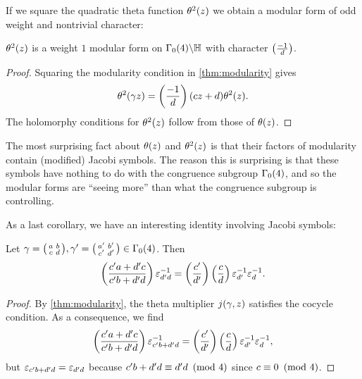 \documentclass[12pt,reqno,oneside]{amsart}
\begin{document}
    If we square the quadratic theta function $\theta^{2}(z)$ we obtain a modular form of odd weight and nontrivial character:

    \begin{corollary}
        $\theta^{2}(z)$ is a weight $1$ modular form on $\Gamma_{0}(4)\backslash\mathbb{H}$ with character $\textstyle{\left(\frac{-1}{d}\right)}$.
    \end{corollary}
    \begin{proof}
        Squaring the modularity condition in \cref{thm:modularity} gives
        \[
            \theta^{2}(\gamma z) = \left(\frac{-1}{d}\right)(cz+d)\theta^{2}(z).
        \]
        The holomorphy conditions for $\theta^{2}(z)$ follow from those of $\theta(z)$.
    \end{proof}
    
    The most surprising fact about $\theta(z)$ and $\theta^{2}(z)$ is that their factors of modularity contain (modified) Jacobi symbols. The reason this is surprising is that these symbols have nothing to do with the congruence subgroup $\Gamma_{0}(4)$, and so the modular forms are ``seeing more'' than what the congruence subgroup is controlling.
    
    As a last corollary, we have an interesting identity involving Jacobi symbols:

    \begin{corollary}
    Let $\gamma = \begin{psmallmatrix} a & b \\ c & d \end{psmallmatrix},\gamma' = \begin{psmallmatrix} a' & b' \\ c' & d' \end{psmallmatrix} \in \Gamma_{0}(4)$. Then
    \[
        \left(\frac{c'a+d'c}{c'b+d'd}\right)\varepsilon_{d'd}^{-1} = \left(\frac{c'}{d'}\right)\left(\frac{c}{d}\right)\varepsilon_{d'}^{-1}\varepsilon_{d}^{-1}.
    \]
    \end{corollary}
    \begin{proof}
    By \cref{thm:modularity}, the theta multiplier $j(\gamma,z)$ satisfies the cocycle condition. As a consequence, we find
    \[
        \left(\frac{c'a+d'c}{c'b+d'd}\right)\varepsilon_{c'b+d'd}^{-1} = \left(\frac{c'}{d'}\right)\left(\frac{c}{d}\right)\varepsilon_{d'}^{-1}\varepsilon_{d}^{-1},
    \]
    but $\varepsilon_{c'b+d'd} = \varepsilon_{d'd}$ because $c'b+d'd \equiv d'd \ \left(\text{mod }4\right)$ since $c \equiv 0 \ \left(\text{mod }4\right)$.
    \end{proof}
\end{document}

